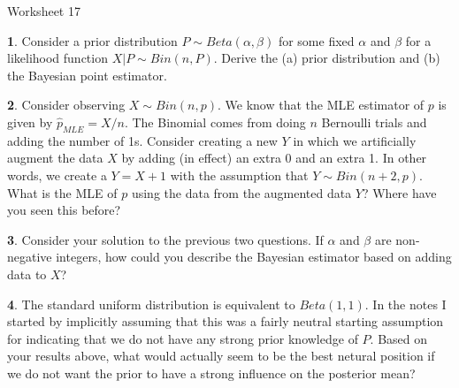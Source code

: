\documentclass{tufte-handout}
\begin{document}
\justify

{\LARGE Worksheet 17}

\vspace*{18pt}


\textbf{1}. Consider a prior distribution $P \sim Beta(\alpha, \beta)$ for some fixed
$\alpha$ and $\beta$ for a likelihood function $X|P \sim Bin(n, P)$. Derive
the (a) prior distribution and (b) the Bayesian point estimator.

\textbf{2}. Consider observing $X \sim Bin(n, p)$. We know that the MLE estimator of $p$ is
given by $\hat{p}_{MLE} = X / n$. The Binomial comes from doing $n$ Bernoulli
trials and adding the number of 1s. Consider creating a new $Y$ in which we 
artificially augment the data $X$ by adding (in effect) an extra 0 and an extra
1. In other words, we create a $Y = X + 1$ with the assumption that
$Y \sim Bin(n+2, p)$. What is the MLE of $p$ using the data from the augmented
data $Y$? Where have you seen this before?

\textbf{3}. Consider your solution to the previous two questions. If $\alpha$ and $\beta$
are non-negative integers, how could you describe the Bayesian estimator based
on adding data to $X$? 

\textbf{4}. The standard uniform distribution is equivalent to $Beta(1,1)$. In the notes
I started by implicitly assuming that this was a fairly neutral starting
assumption for indicating that we do not have any strong prior knowledge of
$P$. Based on your results above, what would actually seem to be the best
netural position if we do not want the prior to have a strong influence on 
the posterior mean?
\end{document}
